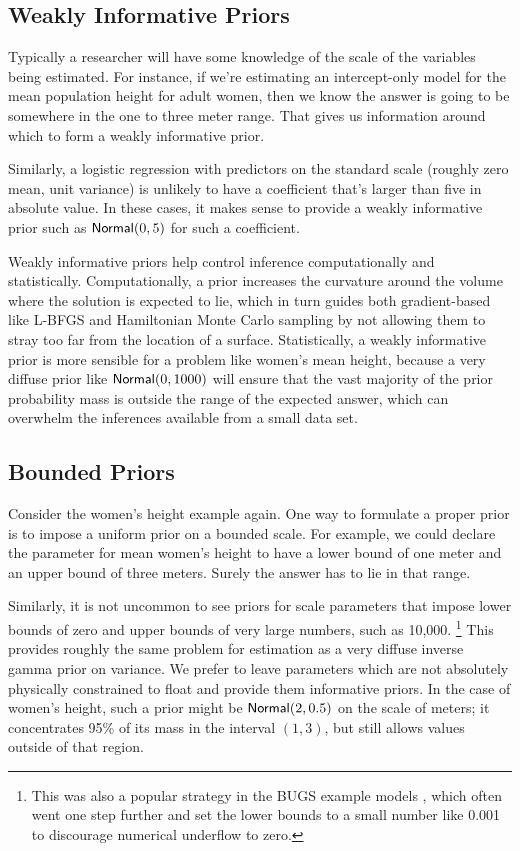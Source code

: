 \subsection{Weakly Informative Priors}

Typically a researcher will have some knowledge of the scale of the
variables being estimated.  For instance, if we're estimating an
intercept-only model for the mean population height for adult women,
then we know the answer is going to be somewhere in the one to three
meter range.  That gives us information around which to form a weakly
informative prior.

Similarly, a logistic regression with predictors on the standard scale
(roughly zero mean, unit variance) is unlikely to have a
coefficient that's larger than five in absolute value.  In these
cases, it makes sense to provide a weakly informative prior such as
$\mbox{\sf Normal}(0,5)$ for such a coefficient.

Weakly informative priors help control inference computationally and
statistically.  Computationally, a prior increases the curvature
around the volume where the solution is expected to lie, which in turn
guides both gradient-based like L-BFGS and Hamiltonian Monte Carlo
sampling by not allowing them to stray too far from the location of a
surface.  Statistically, a weakly informative prior is more sensible
for a problem like women's mean height, because a very diffuse prior
like $\mbox{\sf Normal}(0,1000)$ will ensure that the vast majority of
the prior probability mass is outside the range of the expected
answer, which can overwhelm the inferences available from a small data
set.

\subsection{Bounded Priors}

Consider the women's height example again.  One way to formulate a
proper prior is to impose a uniform prior on a bounded scale.  For
example, we could declare the parameter for mean women's height to
have a lower bound of one meter and an upper bound of three meters.
Surely the answer has to lie in that range.

Similarly, it is not uncommon to see priors for scale parameters that
impose lower bounds of zero and upper bounds of very large numbers,
such as 10,000.%
%
\footnote{This was also a popular strategy in the BUGS example models
  \citep{LunnEtAl:2012}, which often went one step further and set the
  lower bounds to a small number like 0.001 to discourage numerical
  underflow to zero.}
%
This provides roughly the same problem for estimation as a very
diffuse inverse gamma prior on variance.  We prefer to leave
parameters which are not absolutely physically constrained to float
and provide them informative priors.  In the case of women's height,
such a prior might be $\mbox{\sf Normal}(2,0.5)$ on the scale of meters;
it concentrates 95\% of its mass in the interval $(1,3)$, but still
allows values outside of that region.

